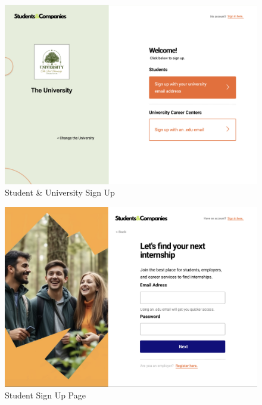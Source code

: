 \documentclass{article}
\begin{document}
\begin{figure}[H]
    \centering
    \includegraphics[scale = 0.40]{figures/UserInterfaces/General/SUSignUp.png}
    \caption{Student \& University Sign Up}
    \centering
\end{figure}
\begin{figure}[H]
    \centering
    \includegraphics[scale = 0.45]{figures/UserInterfaces/General/StudentSignUp.png}
    \caption{Student Sign Up Page}
    \centering
\end{figure}
\end{document}
